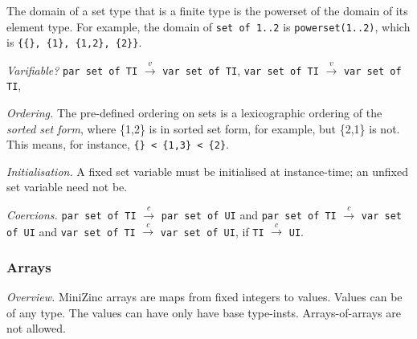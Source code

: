 \documentclass[10pt]{scrartcl}
\newcommand{\pjs}[1]{\textcolor{blue}{PJS:#1}}
\newcommand{\TyThing}[1]{\vspace{1.2mm}\noindent\emph{#1} }
\newcommand{\TyOverview}{\TyThing{Overview.}}
\newcommand{\TyVarifiable}{\TyThing{Varifiable?}}
\newcommand{\TyOrdering}{\TyThing{Ordering.}}
\newcommand{\TyInit}{\TyThing{Initialisation.}}
\newcommand{\TyCoercions}{\TyThing{Coercions.}}
\newcommand{\coerce}[2]{#1 $\stackrel{c}{\rightarrow}$ #2}
\newcommand{\varify}[2]{#1 $\stackrel{v}{\rightarrow}$ #2}
\begin{document}
The domain of a set type that is a finite type is the powerset of the domain
of its element type.  For example, the domain of \texttt{set of 1..2} is
\texttt{powerset(1..2)}, which is \verb+{{}, {1}, {1,2}, {2}}+.

\TyVarifiable
\varify{\texttt{par set of TI}}{\texttt{var set of TI}},
\varify{\texttt{var set of TI}}{\texttt{var set of TI}},

\TyOrdering
%
The pre-defined ordering on sets is a lexicographic ordering of the
\emph{sorted set form}, where \{1,2\} is in sorted set form, for example,
but \{2,1\} is not.
This means, for instance, \verb'{} < {1,3} < {2}'.


\TyInit
A fixed set variable must be initialised at instance-time;  an unfixed
set variable need not be.

\TyCoercions
\coerce{\texttt{par set of TI}}{\texttt{par set of UI}} and
\coerce{\texttt{par set of TI}}{\texttt{var set of UI}} and
\coerce{\texttt{var set of TI}}{\texttt{var set of UI}}, if
\coerce{\texttt{TI}}{\texttt{UI}}.


\subsubsection{Arrays}
        \label{Arrays}
\TyOverview
MiniZinc arrays are maps from fixed integers to values.  
Values can be of any type.  
The values can have only have base type-insts.  
Arrays-of-arrays are not allowed.
\end{document}
